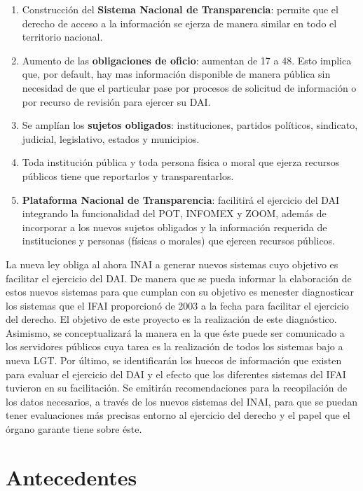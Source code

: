 \begin{enumerate}
\item Construcción del \textbf{Sistema Nacional de Transparencia}: permite que el derecho de acceso a la información se ejerza de manera similar en todo el territorio nacional.
\item Aumento de las \textbf{obligaciones de oficio}: aumentan de 17 a 48. Esto implica que, por default, hay mas información disponible de manera pública sin necesidad de que el particular pase por procesos de solicitud de información o por recurso de revisión para ejercer su DAI.
\item Se amplían los \textbf{sujetos obligados}: instituciones, partidos políticos, sindicato, judicial, legislativo, estados y municipios.
\item Toda institución pública y toda persona física o moral que ejerza recursos públicos tiene que reportarlos y transparentarlos.
\item \textbf{Plataforma Nacional de Transparencia}: facilitirá el ejercicio del DAI integrando la funcionalidad del POT, INFOMEX y ZOOM, además de incorporar a los nuevos sujetos obligados y la información requerida de instituciones y personas (físicas o morales) que ejercen recursos públicos.
\end{enumerate}

La nueva ley obliga al ahora INAI a generar nuevos sistemas cuyo objetivo es facilitar el ejercicio del DAI. De manera que se pueda informar la elaboración de estos nuevos sistemas para que cumplan con su objetivo es menester diagnosticar los sistemas que el IFAI proporcionó de 2003 a la fecha para facilitar el ejercicio del derecho. El objetivo de este proyecto es la realización de este diagnóstico. Asimismo, se conceptualizará la manera en la que éste puede ser comunicado a los servidores públicos cuya tarea es la realización de todos los sistemas bajo a nueva LGT. Por último, se identificarán los huecos de información que existen para evaluar el ejercicio del DAI y el efecto que los diferentes sistemas del IFAI tuvieron en su facilitación. Se emitirán recomendaciones para la recopilación de los datos necesarios, a través de los nuevos sistemas del INAI, para que se puedan tener evaluaciones más precisas entorno al ejercicio del derecho y el papel que el órgano garante tiene sobre éste.


\section{Antecedentes}

